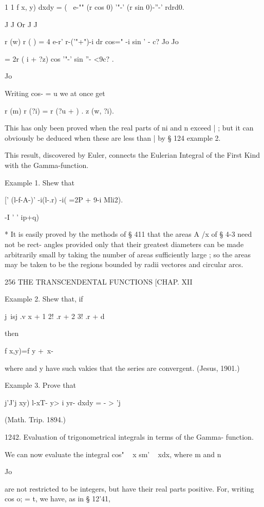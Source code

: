 1 1 f x, y) dxdy = ( \ e-"" (r cos 0) '"-' (r sin 0)-''-' rdrd0. 

J J Or J J 



r (w) r ( ) = 4 e-r' r-('"+")-i dr cos=" -i sin ' - c?  
Jo Jo 

= 2r ( i + ?z) cos '"-' sin ''-  <9c? . 

Jo 



Writing cos- = u we at once get 

r (m) r (?i) = r (?u +  ) . z  (w, ?i). 

This has only been proved when the real parts of ni and n exceed | ; but 
it can obviously be deduced when these are less than | by § 124 example 2. 

This result, discovered by Euler, connects the Eulerian Integral of the 
First Kind with the Gamma-function. 

Example 1. Shew that 

[' (l-f-A-)' -i(l-.r) -i( =2P + 9-i Mli2). 

  -I '   '  ip+q) 

* It is easily proved by the methods of § 411 that the areas A   /x of § 4-3 need not be rect- 
angles provided only that their greatest diameters can be made arbitrarily small by taking the 
number of areas sufficiently large ; so the areas may be taken to be the regions bounded 
by radii vectores and circular arcs. 



256 THE TRANSCENDENTAL FUNCTIONS [CHAP. XII 

Example 2. Shew that, if 

j\ isj .v   x + 1 2! .r + 2 3! .r + d 

then 

f x,y)=f y + \,x-\ \  

where   and y have such vakies that the series are convergent. (Jesus, 1901.) 

Example 3. Prove that 

j'J'j xy) l-xT- y> i yr- dxdy =  - >  'j 

(Math. Trip. 1894.) 

1242. Evaluation of trigonometrical integrals in terms of the Gamma- 
function. 

We can now evaluate the integral cos" ~  x sm' ~  xdx, where m and n 

Jo 

are not restricted to be integers, but have their real parts positive. 
For, writing cos o; = t, we have, as in § 12'41, 

